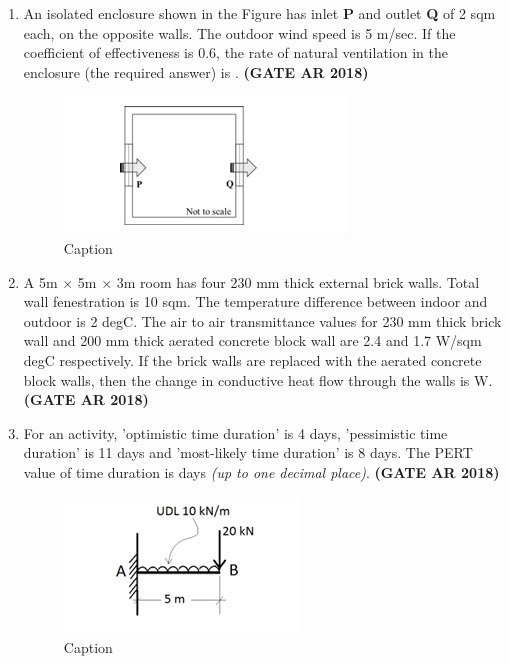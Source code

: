 \documentclass[journal,15pt,onecolumn]{IEEEtran}
\theoremstyle{remark}
\begin{document}
\begin{enumerate}
\item  An isolated enclosure shown in the Figure has inlet \textbf{P} and outlet \textbf{Q} of 2 sqm each, on the opposite walls. The outdoor wind speed is 5 m/sec. If the coefficient of effectiveness is 0.6, the rate of natural ventilation in the enclosure (the required answer) is \underline{\hspace{3cm}}.\hfill \textbf{ (GATE AR 2018)}
\begin{figure} [h]
    \centering
    \includegraphics[width=0.3\linewidth]{figs/Screenshot 2025-08-16 142607.png}
    \caption{Caption}
    \label{fig:placeholder}
\end{figure}


\item 
A 5m $\times$ 5m $\times$ 3m room has four 230 mm thick external brick walls. Total wall fenestration is 10 sqm. The temperature difference between indoor and outdoor is 2 degC. The air to air transmittance values for 230 mm thick brick wall and 200 mm thick aerated concrete block wall are 2.4 and 1.7 W/sqm degC respectively. If the brick walls are replaced with the aerated concrete block walls, then the change in conductive heat flow through the walls is \underline{\hspace{3cm}} W.\hfill \textbf{ (GATE AR 2018)}

\item 
For an activity, 'optimistic time duration' is 4 days, 'pessimistic time duration' is 11 days and 'most-likely time duration' is 8 days. The PERT value of time duration is \underline{\hspace{2cm}} days \emph{(up to one decimal place)}.\hfill \textbf{ (GATE AR 2018)}

\begin{figure}[h]
    \centering
    \includegraphics[width=0.4\linewidth]{figs/Screenshot 2025-08-16 133516.png}
    \caption{Caption}
    \label{fig:placeholder}
\end{figure}





\end{enumerate}
\end{document}
